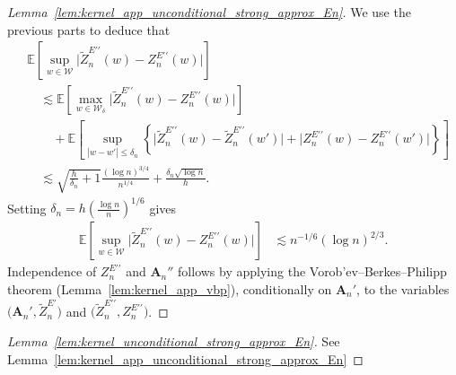 \documentclass[11pt,lof]{puthesis}
\newcommand{\E}{\ensuremath{\mathbb{E}}}
\newcommand{\bA}{\ensuremath{\mathbf{A}}}
\newcommand{\cW}{\ensuremath{\mathcal{W}}}
\newcommand{\dprime}{\ensuremath{\prime\prime}}
\theoremstyle{break}
\theoremstyle{proof}
\newtheorem{proof}{Proof}
\begin{document}
\begin{proof}[Lemma~\ref{lem:kernel_app_unconditional_strong_approx_En}]
  We use the previous parts to deduce that
  \begin{align*}
    &\E\left[
      \sup_{w \in \cW}
      \big|\tilde Z_n^{E\dprime}(w) - Z_n^{E\dprime}(w)\big|
    \right] \\
    &\quad\lesssim
    \E\left[
      \max_{w \in \cW_\delta}
      \big|\tilde Z_n^{E\dprime}(w) - Z_n^{E\dprime}(w)\big|
    \right] \\
    &\qquad+
    \E\left[
      \sup_{|w-w'| \leq \delta_n}
      \left\{
        \big|\tilde Z_n^{E\dprime}(w) - \tilde Z_n^{E\dprime}(w')\big|
        + \big|Z_n^{E\dprime}(w) - Z_n^{E\dprime}(w')\big|
      \right\}
    \right] \\
    &\quad\lesssim
    \sqrt{\frac{h}{\delta_n} + 1}
    \frac{(\log n)^{3/4}}{n^{1/4}}
    + \frac{\delta_n \sqrt{\log n}}{h}.
  \end{align*}
  Setting $\delta_n = h \left( \frac{\log n}{n} \right)^{1/6}$ gives
  \begin{align*}
    \E\left[
      \sup_{w \in \cW}
      \big|\tilde Z_n^{E\dprime}(w) - Z_n^{E\dprime}(w)\big|
    \right]
    &\lesssim
    n^{-1/6} (\log n)^{2/3}.
  \end{align*}
  Independence of $Z_n^{E\dprime}$ and $\bA_n''$
  follows by applying the
  Vorob'ev--Berkes--Philipp theorem (Lemma~\ref{lem:kernel_app_vbp}),
  conditionally on $\bA_n'$, to the variables
  $\big(\bA_n', \tilde Z_n^{E\prime}\big)$ and
  $\big(\tilde Z_n^{E\dprime}, Z_n^{E\dprime}\big)$.
\end{proof}

\begin{proof}[Lemma~\ref{lem:kernel_unconditional_strong_approx_En}]
  See Lemma~\ref{lem:kernel_app_unconditional_strong_approx_En}
\end{proof}
\end{document}
